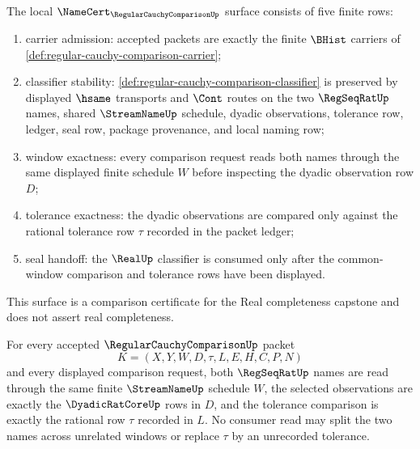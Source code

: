 \begin{theorem}
\label{thm:regular-cauchy-comparison-namecert-obligations}
The local $\NameCert_{\RegularCauchyComparisonUp}$ surface consists of five finite rows:
\begin{enumerate}
\item carrier admission: accepted packets are exactly the finite $\BHist$ carriers of \autoref{def:regular-cauchy-comparison-carrier};
\item classifier stability: \autoref{def:regular-cauchy-comparison-classifier} is preserved by displayed $\hsame$ transports and $\Cont$ routes on the two $\RegSeqRatUp$ names, shared $\StreamNameUp$ schedule, dyadic observations, tolerance row, ledger, seal row, package provenance, and local naming row;
\item window exactness: every comparison request reads both names through the same displayed finite schedule $W$ before inspecting the dyadic observation row $D$;
\item tolerance exactness: the dyadic observations are compared only against the rational tolerance row $\tau$ recorded in the packet ledger;
\item seal handoff: the $\RealUp$ classifier is consumed only after the common-window comparison and tolerance rows have been displayed.
\end{enumerate}
This surface is a comparison certificate for the Real completeness capstone and does not assert real completeness.
\end{theorem}

\begin{theorem}
\label{thm:regular-cauchy-comparison-window-exactness}
For every accepted $\RegularCauchyComparisonUp$ packet
$$
K=(X,Y,W,D,\tau,L,E,H,C,P,N)
$$
and every displayed comparison request, both $\RegSeqRatUp$ names are read through the same finite $\StreamNameUp$ schedule $W$, the selected observations are exactly the $\DyadicRatCoreUp$ rows in $D$, and the tolerance comparison is exactly the rational row $\tau$ recorded in $L$. No consumer read may split the two names across unrelated windows or replace $\tau$ by an unrecorded tolerance.
\end{theorem}

